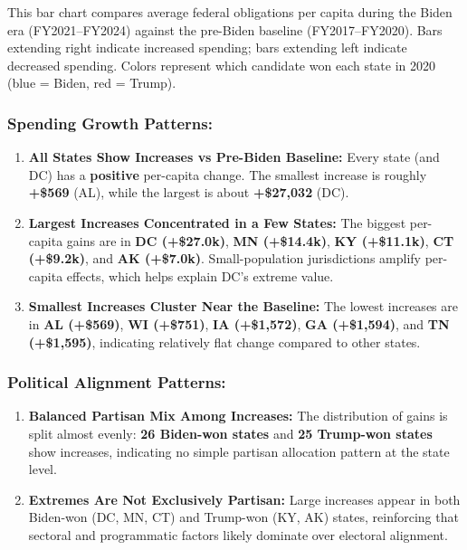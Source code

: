 \documentclass[
  11pt,
]{article}
\begin{document}
This bar chart compares average federal obligations per capita during
the Biden era (FY2021--FY2024) against the pre-Biden baseline
(FY2017--FY2020). Bars extending right indicate increased spending; bars
extending left indicate decreased spending. Colors represent which
candidate won each state in 2020 (blue = Biden, red = Trump).

\subsubsection{Spending Growth
Patterns:}\label{spending-growth-patterns}

\begin{enumerate}
\def\labelenumi{\arabic{enumi}.}
\item
  \textbf{All States Show Increases vs Pre-Biden Baseline:} Every state
  (and DC) has a \textbf{positive} per-capita change. The smallest
  increase is roughly \textbf{+\$569} (AL), while the largest is about
  \textbf{+\$27,032} (DC).
\item
  \textbf{Largest Increases Concentrated in a Few States:} The biggest
  per-capita gains are in \textbf{DC (+\$27.0k)}, \textbf{MN
  (+\$14.4k)}, \textbf{KY (+\$11.1k)}, \textbf{CT (+\$9.2k)}, and
  \textbf{AK (+\$7.0k)}. Small-population jurisdictions amplify
  per-capita effects, which helps explain DC's extreme value.
\item
  \textbf{Smallest Increases Cluster Near the Baseline:} The lowest
  increases are in \textbf{AL (+\$569)}, \textbf{WI (+\$751)},
  \textbf{IA (+\$1,572)}, \textbf{GA (+\$1,594)}, and \textbf{TN
  (+\$1,595)}, indicating relatively flat change compared to other
  states.
\end{enumerate}

\subsubsection{Political Alignment
Patterns:}\label{political-alignment-patterns}

\begin{enumerate}
\def\labelenumi{\arabic{enumi}.}
\item
  \textbf{Balanced Partisan Mix Among Increases:} The distribution of
  gains is split almost evenly: \textbf{26 Biden-won states} and
  \textbf{25 Trump-won states} show increases, indicating no simple
  partisan allocation pattern at the state level.
\item
  \textbf{Extremes Are Not Exclusively Partisan:} Large increases appear
  in both Biden-won (DC, MN, CT) and Trump-won (KY, AK) states,
  reinforcing that sectoral and programmatic factors likely dominate
  over electoral alignment.
\end{enumerate}
\end{document}
